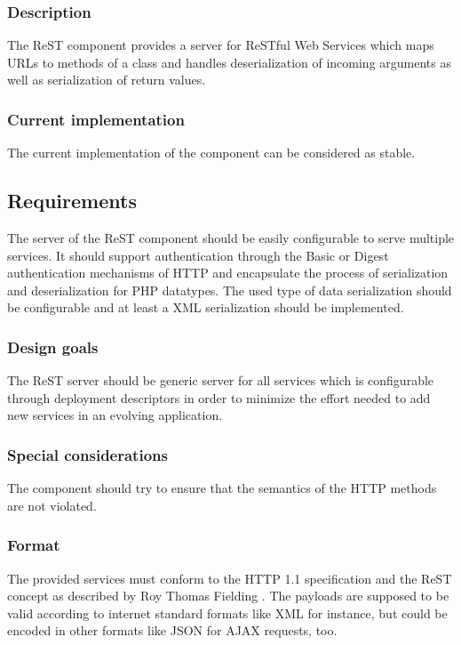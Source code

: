 \documentclass[10pt,final,a4paper,oneside]{article}
\begin{document}
\subsubsection{Description}
The ReST component provides a server for
ReSTful Web Services which maps URLs
to methods of a class and handles
deserialization of incoming arguments
as well as serialization of return values.


\subsubsection{Current implementation}
The current implementation of the component
can be considered as stable.

\subsection{Requirements}\label{subsec:ReSTRequirements}
The server of the ReST component 
should be easily configurable to serve multiple services.
It should support authentication through
the Basic or Digest authentication mechanisms of HTTP
and encapsulate the process of serialization and deserialization
for PHP datatypes. The used type of data serialization should be configurable
and at least a XML serialization should be implemented.

\subsubsection{Design goals}
The ReST server should be generic server for all services
which is configurable through deployment descriptors
in order to minimize the effort needed to add
new services in an evolving application.

\subsubsection{Special considerations}
The component should try to ensure that the
semantics of the HTTP methods
are not violated.

\subsubsection{Format}
The provided services must conform to the
HTTP 1.1 specification and the ReST concept
as described by Roy Thomas Fielding \cite{ReSTpaper}.
The payloads are supposed to be valid according to 
internet standard formats like XML \cite{XML} for instance, 
but could be encoded in other formats like JSON for AJAX requests, too.
\end{document}
